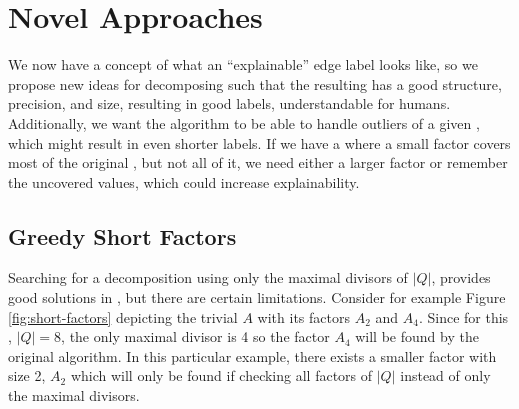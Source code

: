 \chapter{Novel Approaches}
\label{ch:novel-algos}
We now have a concept of what an \enquote{explainable} edge label looks like, so we propose new ideas for decomposing \DFAs such that the resulting \orDecomp has a good structure, precision, and size, resulting in good labels, understandable for humans.
Additionally, we want the algorithm to be able to handle outliers of a given \orDecomp, which might result in even shorter labels.
If we have a \orDecomp where a small factor covers most of the original \DFA, but not all of it, we need either a larger factor or remember the uncovered values, which could increase explainability.

\section{Greedy Short Factors}
\label{ch:novel-algos:greedy-short-factors}
Searching for a decomposition using only the maximal divisors of $|Q|$, provides good solutions in \LogSpace, but there are certain limitations.
Consider for example Figure \ref{fig:short-factors} depicting the trivial \DFA $A$ with its factors $A_2$ and $A_4$.
Since for this \DFA, $|Q| = 8$, the only maximal divisor is 4 so the factor $A_4$ will be found by the original algorithm.
In this particular example, there exists a smaller factor with size 2, $A_2$ which will only be found if checking all factors of $|Q|$ instead of only the maximal divisors.

